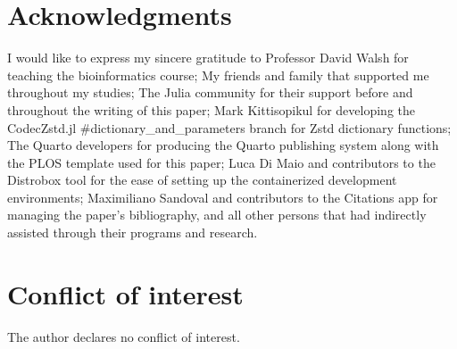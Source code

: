 \documentclass[
  10pt,
  letterpaper,
]{article}
\begin{document}
\hypertarget{acknowledgments}{%
\section{Acknowledgments}\label{acknowledgments}}

I would like to express my sincere gratitude to Professor David Walsh
for teaching the bioinformatics course; My friends and family that
supported me throughout my studies; The Julia community for their
support before and throughout the writing of this paper; Mark
Kittisopikul for developing the CodecZstd.jl
\#dictionary\_and\_parameters branch for Zstd dictionary functions; The
Quarto developers for producing the Quarto publishing
system\citep{Allaire_Quarto_2022} along with the PLOS template used for
this paper; Luca Di Maio and contributors to the Distrobox tool for the
ease of setting up the containerized development
environments\citep{maio}; Maximiliano Sandoval and contributors to the
Citations app for managing the paper's bibliography\citep{sandoval}, and
all other persons that had indirectly assisted through their programs
and research.

\hypertarget{conflict-of-interest}{%
\section{Conflict of interest}\label{conflict-of-interest}}

The author declares no conflict of interest.


\nolinenumbers
  
\end{document}
